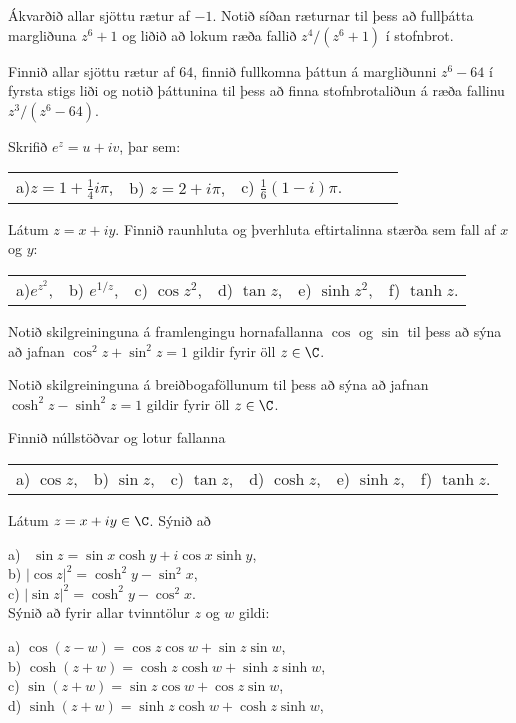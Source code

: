 \daemi Ákvarðið allar sjöttu  rætur af $-1$.  Notið síðan ræturnar til
þess að fullþátta  margliðuna $z^6+1$ og  liðið að lokum  ræða fallið
$z^4/(z^6+1)$ í stofnbrot.

\daemi Finnið allar sjöttu rætur af $64$, finnið fullkomna þáttun á
margliðunni $z^6-64$ í fyrsta stigs liði og notið þáttunina til þess
að finna stofnbrotaliðun á ræða fallinu $z^3/(z^6-64)$.


\daemi Skrifið $e^z=u+iv$, þar sem:


\smallskip\noindent
\begin{tabular}{llllll}
 a)$z=1+\tfrac 14i\pi$, 
&b) $z=2+i\pi$,
&c) $\tfrac16(1-i)\pi$.
\end{tabular}

\daemi Látum $z=x+iy$. Finnið raunhluta og þverhluta eftirtalinna
stærða sem fall af $x$ og $y$:

\smallskip\noindent
\begin{tabular}{llllll}
 a)$e^{z^2}$, 
&b) $e^{1/z}$,
&c) $\cos z^2$,
&d) $\tan z$, 
&e) $\sinh z^2$,
&f) $\tanh z$.\\
\end{tabular}


\daemi Notið skilgreininguna á framlengingu hornafallanna $\cos $ og $\sin $ til
þess að sýna að jafnan $\cos^2z+\sin^2z=1$ gildir fyrir öll $z\in \C$. 

\daemi Notið skilgreininguna á breiðbogaföllunum til þess að sýna
að  jafnan $\cosh^2 z-\sinh^2 z=1$ gildir fyrir öll $z\in \C$.


\daemi Finnið núllstöðvar og lotur fallanna

\smallskip\noindent
\begin{tabular}{llllll}
 a) $\cos z$, 
&b) $\sin z$,
&c) $\tan z$,
&d) $\cosh z$, 
&e) $\sinh z$,
&f) $\tanh z$.\\
\end{tabular}

\daemi Látum $z=x+iy\in \C$.  Sýnið  að

\smallskip\noindent
a)  \ $\sin z=\sin x\cosh y+i\cos x \sinh y$,\\
b) $|\cos z|^2=\cosh^2y-\sin^2 x$,\\
c)  $|\sin z|^2=\cosh^2y-\cos^2 x$.\\



\daemi Sýnið að fyrir allar tvinntölur $z$ og $w$ gildi:

\smallskip\noindent
a)  $\cos(z-w)=\cos z\cos w+\sin z \sin w$,\\
b)  $\cosh(z+w)=\cosh z\cosh w+\sinh z \sinh w$,\\
c)  $\sin(z+w)=\sin z\cos w+\cos z \sin w$,\\
d)  $\sinh(z+w)=\sinh z\cosh w+\cosh z \sinh w$,\\


